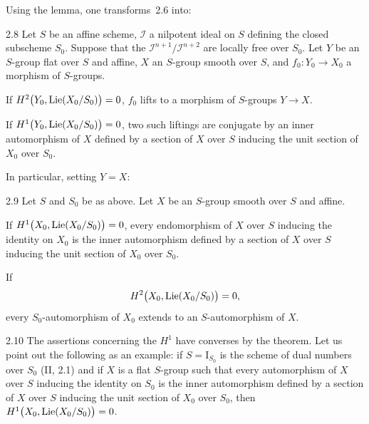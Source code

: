 Using the lemma, one transforms~2.6 into:

\begin{corollary}{2.8}\label{III.2.8}
Let \(S\) be an affine scheme, \(\mathcal{I}\) a nilpotent ideal on \(S\)
defining the closed subscheme \(S_{0}\). Suppose that the
\(\mathcal{I}^{n+1}/\mathcal{I}^{n+2}\) are locally free over \(S_{0}\). Let \(Y\)
be an \(S\)-group flat over \(S\) and affine, \(X\) an \(S\)-group smooth over
\(S\), and \(f_{0}\colon Y_{0}\to X_{0}\) a morphism of \(S\)-groups.
\begin{enumeratei}
\item If \(H^{2}\bigl(Y_{0},\operatorname{Lie}(X_{0}/S_{0})\bigr)=0\), \(f_{0}\) lifts to a
morphism of \(S\)-groups \(Y\to X\).
\item If \(H^{1}\bigl(Y_{0},\operatorname{Lie}(X_{0}/S_{0})\bigr)=0\), two such liftings are
conjugate by an inner automorphism of \(X\) defined by a section of \(X\) over
\(S\) inducing the unit section of \(X_{0}\) over \(S_{0}\).
\end{enumeratei}
\end{corollary}

In particular, setting \(Y=X\):

\begin{corollary}{2.9}\label{III.2.9}
Let \(S\) and \(S_{0}\) be as above. Let \(X\) be an \(S\)-group smooth over
\(S\) and affine.
\begin{enumeratei}
\item If \(H^{1}\bigl(X_{0},\operatorname{Lie}(X_{0}/S_{0})\bigr)=0\), every endomorphism of
\(X\) over \(S\) inducing the identity on \(X_{0}\) is the inner automorphism
defined by a section of \(X\) over \(S\) inducing the unit section of \(X_{0}\)
over \(S_{0}\).
\item If
\[
H^{2}\bigl(X_{0},\operatorname{Lie}(X_{0}/S_{0})\bigr)=0,
\]
every
\(S_{0}\)-automorphism of \(X_{0}\) extends to an \(S\)-automorphism of
\(X\).%
{\renewcommand{\thefootnote}{(62)}}
\end{enumeratei}
\end{corollary}

\begin{remark}{2.10}\label{III.2.10}
The assertions concerning the \(H^{1}\) have converses by the theorem. Let us
point out the following as an example: if \(S=\mathrm{I}_{S_{0}}\) is the
scheme of dual numbers over \(S_{0}\) (II, 2.1) and if \(X\) is a flat
\(S\)-group such that every automorphism of \(X\) over \(S\) inducing the
identity on \(S_{0}\) is the inner automorphism defined by a section of \(X\)
over \(S\) inducing the unit section of \(X_{0}\) over \(S_{0}\), then
\(H^{1}\bigl(X_{0},\operatorname{Lie}(X_{0}/S_{0})\bigr)=0\).%
{\renewcommand{\thefootnote}{(63)}}
\end{remark}

